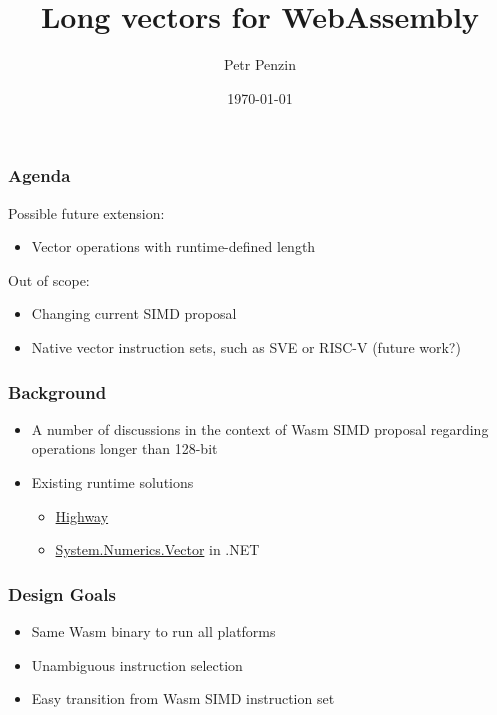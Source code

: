 \documentclass[t,aspectratio=169, xcolor={table}]{beamer}
\title{Long vectors for WebAssembly}
\author{Petr Penzin}
\institute{Intel Corporation}
\date{\today}
\begin{document}
\begin{frame}
  \titlepage
\end{frame}
\begin{frame}
\frametitle{Agenda}

Possible future extension:

  \begin{itemize}
  \item Vector operations with runtime-defined length
  \end{itemize}

Out of scope:

  \begin{itemize}
  \item Changing current SIMD proposal
  \item Native vector instruction sets, such as SVE or RISC-V (future work?)
  \end{itemize}
\end{frame}
\begin{frame}
\frametitle{Background}
  \begin{itemize}
  \item A number of discussions in the context of Wasm SIMD proposal regarding operations longer than 128-bit\footnotemark[1]\footnotemark[2]
  \item Existing runtime solutions
    \begin{itemize}
    \item \href{https://github.com/google/highway}{Highway}
    \item \href{https://docs.microsoft.com/en-us/dotnet/api/system.numerics.vector}{System.Numerics.Vector} in .NET
    \end{itemize}
  \end{itemize}
\end{frame}
\begin{frame}
\frametitle{Design Goals}
  \begin{itemize}
  \item Same Wasm binary to run all platforms
  \item Unambiguous instruction selection
  \item Easy transition from Wasm SIMD instruction set
  \end{itemize}
\end{frame}
\end{document}
